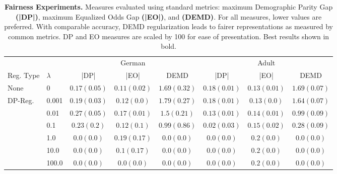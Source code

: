 \begin{table*}
	\scriptsize
	\setlength\tabcolsep{10pt} %
	\caption[Additional DEMD fairness results 1]{\textbf{Fairness Experiments.} Measures evaluated using standard metrics: maximum Demographic Parity Gap \textbf{(|DP|)},  maximum Equalized Odds Gap \textbf{(|EO|)}, and \textbf{(DEMD)}. For all measures, lower values are preferred.  With comparable accuracy, DEMD regularization leads to fairer representations as measured by common metrics. DP and EO measures are scaled by 100 for ease of presentation. Best results shown in bold.}
	\begin{tabular*}{\linewidth}{ll| *{3}{c}|*{3}{c}}
		\midrule%
		& & \multicolumn{3}{c}{German} & \multicolumn{3}{c}{Adult} \\
		\cmidrule{3-5} \cmidrule{6-8}
		Reg. Type & $\lambda$ & |DP| & |EO| & DEMD & |DP| & |EO| & DEMD \\ 
		\midrule
		None & 0 & $0.17\scriptscriptstyle(0.05)$ & $0.11\scriptscriptstyle(0.02)$ & $1.69\scriptscriptstyle(0.32)$ & $0.18\scriptscriptstyle(0.01)$ & $0.13\scriptscriptstyle(0.01)$ & $1.69\scriptscriptstyle(0.07)$ \\
\midrule
DP-Reg. & 0.001 & $0.19\scriptscriptstyle(0.03)$ & $0.12\scriptscriptstyle(0.0)$ & $1.79\scriptscriptstyle(0.27)$ & $0.18\scriptscriptstyle(0.01)$ & $0.13\scriptscriptstyle(0.0)$ & $1.64\scriptscriptstyle(0.07)$ \\
	 & 0.01 & $0.27\scriptscriptstyle(0.05)$ & $0.17\scriptscriptstyle(0.01)$ & $1.5\scriptscriptstyle(0.21)$ & $0.13\scriptscriptstyle(0.01)$ & $0.14\scriptscriptstyle(0.01)$ & $0.99\scriptscriptstyle(0.09)$ \\
	 & 0.1 & $0.23\scriptscriptstyle(0.2)$ & $0.12\scriptscriptstyle(0.1)$ & $0.99\scriptscriptstyle(0.86)$ & $0.02\scriptscriptstyle(0.03)$ & $0.15\scriptscriptstyle(0.02)$ & $0.28\scriptscriptstyle(0.09)$ \\
	 & 1.0 & $0.0\scriptscriptstyle(0.0)$ & $0.19\scriptscriptstyle(0.17)$ & $0.0\scriptscriptstyle(0.0)$ & $0.0\scriptscriptstyle(0.0)$ & $0.2\scriptscriptstyle(0.0)$ & $0.0\scriptscriptstyle(0.0)$ \\
	 & 10.0 & $0.0\scriptscriptstyle(0.0)$ & $0.1\scriptscriptstyle(0.17)$ & $0.0\scriptscriptstyle(0.0)$ & $0.0\scriptscriptstyle(0.0)$ & $0.2\scriptscriptstyle(0.0)$ & $0.0\scriptscriptstyle(0.0)$ \\
	 & 100.0 & $0.0\scriptscriptstyle(0.0)$ & $0.0\scriptscriptstyle(0.0)$ & $0.0\scriptscriptstyle(0.0)$ & $0.0\scriptscriptstyle(0.0)$ & $0.2\scriptscriptstyle(0.0)$ & $0.0\scriptscriptstyle(0.0)$ \\

\end{tabular*}
\end{table*}

